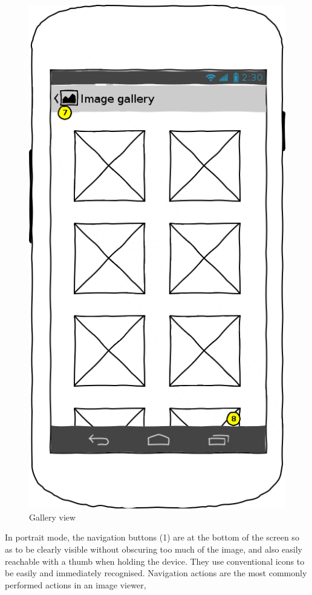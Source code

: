\documentclass[a4paper,11pt]{article}
\begin{document}
\begin{figure}[t]
	\centering
	\includegraphics[scale=0.4]{gallery}
	\caption{Gallery view}
	\label{g}
\end{figure}

In portrait mode, the navigation buttons (1) are at the bottom of the screen so as to be clearly visible without obscuring too much of the image, and also easily reachable with a thumb when holding the device.  They use conventional icons to be easily and immediately recognised.  Navigation actions are the most commonly performed actions in an image viewer, 
\end{document}
